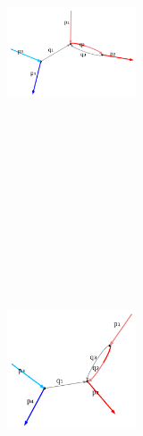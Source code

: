 \documentclass[
  11pt,
  a4paper,
  DIV=11,
  numbers=noendperiod,
  twoside]{scrreprt}
\DeclareRobustCommand{\[}{\begin{equation}}
\DeclareRobustCommand{\]}{\end{equation}}
\begin{document}
\begin{figure}
\begin{minipage}[t]{0.25\linewidth}
{\begin{figure}[H]
{}

\end{figure}

}

\end{minipage}%
%
\begin{minipage}[t]{0.25\linewidth}

{\centering 

\begin{figure}[H]

{\centering \includegraphics[width=1.5in,height=3.5in]{./scattering_files/figure-latex/dot-figure-16.png}

}

\end{figure}

}

\end{minipage}%
%
\begin{minipage}[t]{0.25\linewidth}

{\centering 

\begin{figure}[H]

{\centering \includegraphics[width=1.5in,height=3.5in]{./scattering_files/figure-latex/dot-figure-15.png}

}
\end{figure}}
\end{minipage}
\end{figure}
\end{document}
